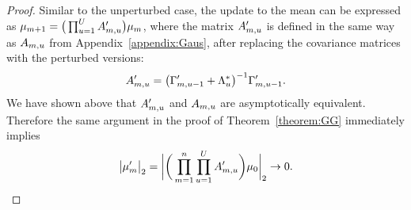 \begin{proof}
Similar to the unperturbed case, the update to the mean can be expressed as $\mu_{m+1} = \big(\prod_{u = 1}^UA'_{m, u}\big)\mu_m$, where the matrix $A'_{m, u}$ is defined in the same way as $A_{m, u}$ from Appendix~\ref{appendix:Gaus}, after replacing the covariance matrices with the perturbed versions: 
$$
A'_{m, u} = \big(\Gamma'_{m, u - 1} + \Lambda^*_u\big)^{-1}\Gamma'_{m, u - 1}.
$$
We have shown above that $A'_{m, u}$ and $A_{m, u}$ are asymptotically equivalent. 
Therefore the same argument in the proof of Theorem~\ref{theorem:GG} immediately implies
$$
\big\vert \mu'_{m} \big\vert_2 =
  \bigg\vert
    \bigg(
      \prod_{m = 1}^n\prod_{u = 1}^U A'_{m, u}
    \bigg)
    \mu_0
  \bigg\vert_2 \rightarrow 0.
$$

   \end{proof}
